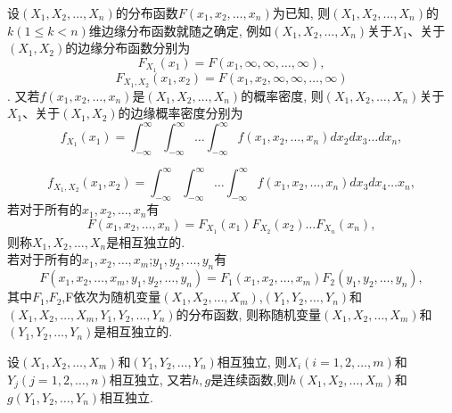 \begin{definition*}

    设$(X_1,X_2,\dots,X_n)$的分布函数$F(x_1,x_2,\dots,x_n)$为已知, 则$(X_1,X_2,\dots,X_n)$的$k(1 \leq k < n )$维边缘分布函数就随之确定, 例如$(X_1,X_2,\dots,X_n)$关于$X_1$、关于$(X_1,X_2)$的边缘分布函数分别为
    \[F_{X_1}(x_1) = F(x_1,\infty,\infty,\dots,\infty),\]
    \[F_{X_1,X_2}(x_1,x_2) = F(x_1,x_2,\infty,\infty,\dots,\infty)\].
又若$f(x_1,x_2,\dots,x_n)$是$(X_1,X_2,\dots,X_n)$的概率密度, 则$(X_1,X_2,\dots,X_n)$关于$X_1$、关于$(X_1,X_2)$的边缘概率密度分别为
    \[f_{X_1}(x_1) = \int_{-\infty}^{\infty}\int_{-\infty}^{\infty}
    \dots \int_{-\infty}^{\infty}f(x_1,x_2,\dots,x_n)d{x_2}d{x_3}\dots d{x_n},\]

    \[f_{X_1,X_2}\left(x_1,x_2\right) = \int_{-\infty}^{\infty} \int_{-\infty}^{\infty} \dots \int_{-\infty}^{\infty}f\left(x_1,x_2,\dots,x_n\right)d{x_3}d{x_4} \dots {x_n},\]
    \quad 若对于所有的$x_1,x_2,\dots,x_n$有
    \[F\left(x_1,x_2,\dots,x_n\right) = F_{X_1}\left(x_1\right)F_{X_2}\left(x_2\right)\dots F_{X_n}\left(x_n\right),\]
    则称$X_1,X_2,\dots,X_n$是相互独立的.\\
    若对于所有的$x_1,x_2,\dots,x_m$;$y_1,y_2,\dots,y_n$有
    \[F\left(x_1,x_2,\dots,x_m,y_1,y_2,\dots,y_n\right) = F_1\left(x_1,x_2,\dots,x_m\right)F_2\left(y_1,y_2,\dots,y_n\right),\]
    其中$F_1$,$F_2$,F依次为随机变量$\left(X_1,X_2,\dots,X_m\right)$,$\left(Y_1,Y_2,\dots,Y_n\right)$和$\left(X_1,X_2,\dots,X_m,Y_1,Y_2,\dots,Y_n\right)$的分布函数, 则称随机变量$\left(X_1,X_2,\dots,X_m\right)$和$\left(Y_1,Y_2,\dots,Y_n\right)$是相互独立的.
\end{definition*}


\begin{theorem}
    设$\left(X_1,X_2,\dots,X_m\right)$和$\left(Y_1,Y_2,\dots,Y_n\right)$相互独立, 则$X_i\left(i = 1,2,\dots,m\right)$和$Y_j\left(j = 1,2,\dots,n\right)$相互独立, 又若$h,g$是连续函数,则$h\left(X_1,X_2,\dots,X_m\right)$和$g\left(Y_1,Y_2,\dots,Y_n\right)$相互独立.
\end{theorem}
